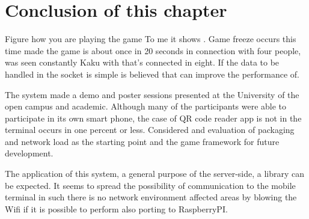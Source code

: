 \section{Conclusion of this chapter}
Figure how you are playing the game To me it shows .
Game freeze occurs this time made the game is about once in 20 seconds in connection with four people, was seen constantly Kaku with that's connected in eight. If the data to be handled in the socket is simple is believed that can improve the performance of.

The system made a demo and poster sessions presented at the University of the open campus and academic. Although many of the participants were able to participate in its own smart phone, the case of QR code reader app is not in the terminal occurs in one percent or less.
Considered and evaluation of packaging and network load as the starting point and the game framework for future development.


The application of this system, a general purpose of the server-side, a library can be expected. It seems to spread the possibility of communication to the mobile terminal in such there is no network environment affected areas by blowing the Wifi if it is possible to perform also porting to RaspberryPI.


\newpage
